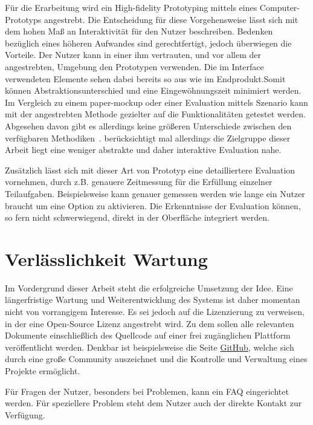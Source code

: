 Für die Erarbeitung wird ein High-fidelity Prototyping mittels eines Computer-Prototyps angestrebt. Die Entscheidung für diese Vorgehensweise lässt sich mit dem hohen Maß an Interaktivität für den Nutzer beschreiben. Bedenken bezüglich eines höheren Aufwandes sind gerechtfertigt, jedoch überwiegen die Vorteile. Der Nutzer kann in einer ihm vertrauten, und vor allem der angestrebten, Umgebung den Prototypen verwenden. Die im Interface verwendeten Elemente sehen dabei bereits so aus wie im Endprodukt.Somit können Abstraktionsunterschied und eine Eingewöhnungszeit minimiert werden. Im Vergleich zu einem paper-mockup oder einer Evaluation mittels Szenario kann mit der angestrebten Methode gezielter auf die Funktionalitäten getestet werden. Abgesehen davon gibt es allerdings keine größeren Unterschiede zwischen den verfügbaren Methodiken~\cite{johansson_case_2007}. berücksichtigt mal allerdings die Zielgruppe dieser Arbeit liegt eine weniger abstrakte und daher interaktive Evaluation nahe. 

Zusätzlich lässt sich mit dieser Art von Prototyp eine detailliertere Evaluation vornehmen, durch z.B. genauere Zeitmessung für die Erfüllung einzelner Teilaufgaben. Beispielsweise kann genauer gemessen werden wie lange ein Nutzer braucht um eine Option zu aktivieren. Die Erkenntnisse der Evaluation können, so fern nicht schwerwiegend, direkt in der Oberfläche integriert werden.
\section{Verlässlichkeit Wartung}
Im Vordergrund dieser Arbeit steht die erfolgreiche Umsetzung der Idee. Eine längerfristige Wartung und Weiterentwicklung des Systems ist daher momentan nicht von vorrangigem Interesse. Es sei jedoch auf die Lizenzierung zu verweisen, in der eine Open-Source Lizenz angestrebt wird. Zu dem sollen alle relevanten Dokumente einschließlich des Quellcode auf einer frei zugänglichen Plattform veröffentlicht werden.
Denkbar ist beispielsweise die Seite \href{https://github.com/}{GitHub}, welche sich durch eine große Community auszeichnet und die Kontrolle und Verwaltung eines Projekte ermöglicht.

Für Fragen der Nutzer, besonders bei Problemen, kann ein \acrshort{FAQ} eingerichtet werden. Für speziellere Problem steht dem Nutzer auch der direkte Kontakt zur Verfügung.
